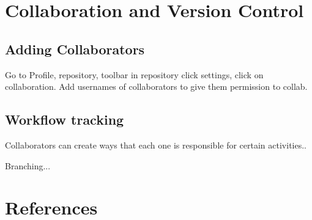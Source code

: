 \documentclass[12pt]{../SOP3_beta}
\begin{document}

\section{Collaboration and Version Control}

\subsection{Adding Collaborators}
\NP Go to Profile, repository, toolbar in repository click settings, click on collaboration. Add usernames of collaborators to give them permission to collab.

\subsection{Workflow tracking}

\NP Collaborators can create ways that each one is responsible for certain activities..

\NP Branching...
 

\section{References}

\NP 
\end{document}
